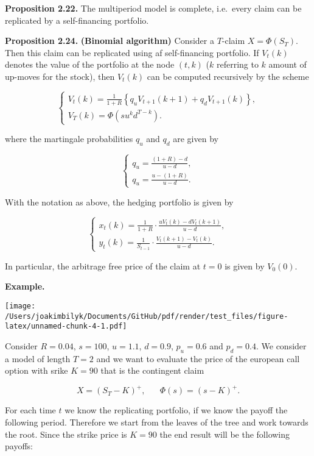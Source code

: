 \documentclass[
]{article}
\begin{document}
\textbf{Proposition 2.22.} The multiperiod model is complete, i.e.~every
claim can be replicated by a self-financing portfolio.

\textbf{Proposition 2.24.} \textbf{(Binomial algorithm)} Consider a
\(T\)-claim \(X=\Phi(S_T)\). Then this claim can be replicated using af
self-financing portfolio. If \(V_t(k)\) denotes the value of the
portfolio at the node \((t,k)\) (\(k\) referring to \(k\) amount of
up-moves for the stock), then \(V_t(k)\) can be computed recursively by
the scheme

\[
\left\{\begin{matrix}V_t(k)=\frac{1}{1+R}\left\{q_uV_{t+1}(k+1)+q_dV_{t+1}(k)\right\},\\ V_T(k)=\Phi(su^kd^{T-k}).\end{matrix}\right.
\]

where the martingale probabilities \(q_u\) and \(q_d\) are given by

\[
\left\{\begin{matrix}q_u=\frac{(1+R)-d}{u-d},\\ q_u=\frac{u-(1+R)}{u-d}.\end{matrix}\right.
\]

With the notation as above, the hedging portfolio is given by

\[
\left\{\begin{matrix}x_t(k)=\frac{1}{1+R}\cdot\frac{uV_t(k)-dV_t(k+1)}{u-d},\\ y_t(k)=\frac{1}{S_{t-1}}\cdot\frac{V_t(k+1)-V_t(k)}{u-d}.\end{matrix}\right.
\]

In particular, the arbitrage free price of the claim at \(t=0\) is given
by \(V_0(0)\).

\textbf{Example.}

\texttt{[image: /Users/joakimbilyk/Documents/GitHub/pdf/render/test\_files/figure-latex/unnamed-chunk-4-1.pdf]}

Consider \(R=0.04\), \(s=100\), \(u=1.1\), \(d=0.9\), \(p_u=0.6\) and
\(p_d=0.4\). We consider a model of length \(T=2\) and we want to
evaluate the price of the european call option with srike \(K=90\) that
is the contingent claim

\[
X=(S_T-K)^+,\hspace{20pt}\Phi(s)=(s-K)^+.
\]

For each time \(t\) we know the replicating portfolio, if we know the
payoff the following period. Therefore we start from the leaves of the
tree and work towards the root. Since the strike price is \(K=90\) the
end result will be the following payoffs:
\end{document}
